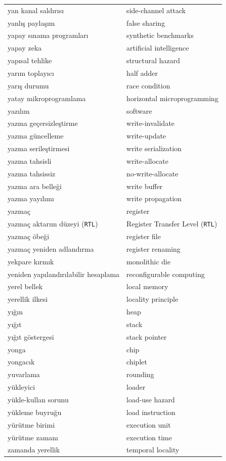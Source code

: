 {\begin{longtable}{@{}p{7.6cm}p{7.6cm}@{}}
yan kanal saldırısı & side-channel attack \\
yanlış paylaşım & false sharing \\
yapay sınama programları & synthetic benchmarks \\
yapay zeka & artificial intelligence \\
yapısal tehlike & structural hazard \\
yarım toplayıcı & half adder \\
yarış durumu & race condition \\
yatay mikroprogramlama & horizontal microprogramming \\
yazılım & software \\
yazma geçersizleştirme & write-invalidate \\
yazma güncelleme & write-update \\
yazma serileştirmesi & write serialization \\
yazma tahsisli & write-allocate \\
yazma tahsissiz & no-write-allocate \\
yazma ara belleği & write buffer \\
yazma yayılımı & write propagation \\
yazmaç & register \\
yazmaç aktarım düzeyi (\texttt{RTL}) & Register Transfer Level (\texttt{RTL}) \\
yazmaç öbeği & register file \\
yazmaç yeniden adlandırma & register renaming \\
yekpare kırmık & monolithic die \\
yeniden yapılandırılabilir hesaplama & reconfigurable computing \\
yerel bellek & local memory \\
yerellik ilkesi & locality principle \\
yığın & heap \\
yığıt & stack \\
yığıt göstergesi & stack pointer \\
yonga & chip \\
yongacık & chiplet \\
yuvarlama & rounding \\
yükleyici & loader \\
yükle-kullan sorunu & load-use hazard \\
yükleme buyruğu & load instruction \\
yürütme birimi & execution unit \\
yürütme zamanı & execution time \\

zamanda yerellik & temporal locality \\

\end{longtable}
}


